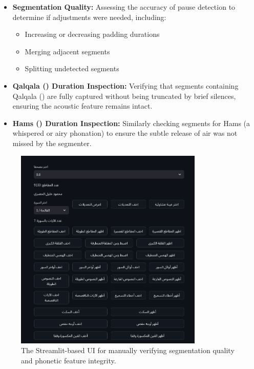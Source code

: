 \begin{itemize}
\item \textbf{Segmentation Quality:} Assessing the accuracy of pause detection to determine if adjustments were needed, including:
\begin{itemize}
    \item Increasing or decreasing padding durations
    \item Merging adjacent segments
    \item Splitting undetected segments
\end{itemize}
\item \textbf{Qalqala () Duration Inspection:} Verifying that segments containing Qalqala () are fully captured without being truncated by brief silences, ensuring the acoustic feature remains intact.
\item \textbf{Hams () Duration Inspection:} Similarly checking segments for Hams (a whispered or airy phonation) to ensure the subtle release of air was not missed by the segmenter.
\end{itemize}

\begin{figure}[H]
\centering
\includegraphics[width=0.8\textwidth]{../figures/data_verfication_ui.png}
\caption{The Streamlit-based UI for manually verifying segmentation quality and phonetic feature integrity.}
\label{fig:verification_ui}
\end{figure}

